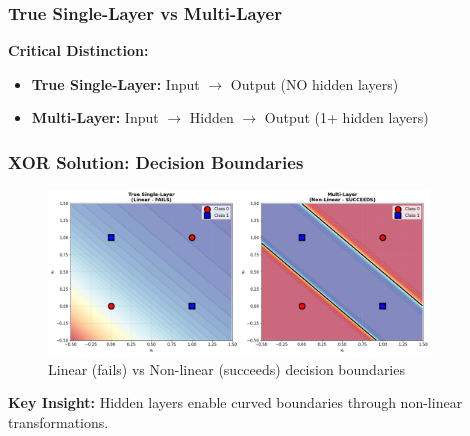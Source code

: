 \documentclass[notes]{beamer}
\begin{document}
\begin{frame}
\frametitle{True Single-Layer vs Multi-Layer}

\textbf{Critical Distinction:}
\begin{itemize}
\item \textbf{True Single-Layer:} Input $\to$ Output (NO hidden layers)
\item \textbf{Multi-Layer:} Input $\to$ Hidden $\to$ Output (1+ hidden layers)
\end{itemize}


\end{frame}

\begin{frame}
\frametitle{XOR Solution: Decision Boundaries}

\begin{figure}[ht]
	\centering
	\includegraphics[width=0.9\textwidth]{figs/xor-decision-boundaries.png}
	\caption*{Linear (fails) vs Non-linear (succeeds) decision boundaries}
\end{figure}

\textbf{Key Insight:} Hidden layers enable curved boundaries through non-linear transformations.

\end{frame}
\end{document}
